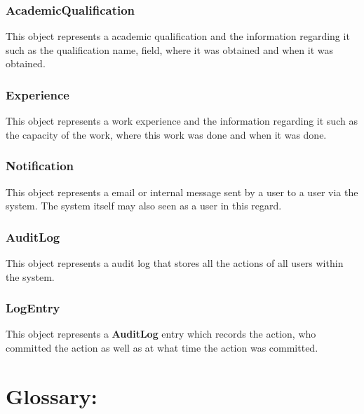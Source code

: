 \documentclass[12pt]{article}
\begin{document}
\subsubsection{AcademicQualification}
This object represents a academic qualification and the information regarding it such as the qualification name, field, where it was obtained and when it was obtained.

\subsubsection{Experience}
This object represents a work experience and the information regarding it such as the capacity of the work, where this work was done and when it was done.

\subsubsection{Notification}
This object represents a email or internal message sent by a user to a user via the system. The system itself may also seen as a user in this regard.

\subsubsection{AuditLog}
This object represents a audit log that stores all the actions of all users within the system.

\subsubsection{LogEntry}
This object represents a \textbf{AuditLog} entry which records the action, who committed the action as well as at what time the action was committed.

\newpage
\section{Glossary:}
\vspace{0.2in}
\end{document}
